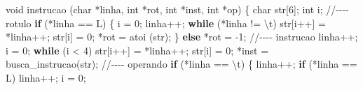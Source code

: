 \documentclass[
  brazilian,
  letterpaper,
]{book}
\newenvironment{Shaded}{\begin{snugshade}}{\end{snugshade}}
\newcommand{\CharTok}[1]{\textcolor[rgb]{0.13,0.47,0.30}{#1}}
\newcommand{\CommentTok}[1]{\textcolor[rgb]{0.37,0.37,0.37}{#1}}
\newcommand{\ControlFlowTok}[1]{\textcolor[rgb]{0.00,0.23,0.31}{\textbf{#1}}}
\newcommand{\DataTypeTok}[1]{\textcolor[rgb]{0.68,0.00,0.00}{#1}}
\newcommand{\DecValTok}[1]{\textcolor[rgb]{0.68,0.00,0.00}{#1}}
\newcommand{\NormalTok}[1]{\textcolor[rgb]{0.00,0.23,0.31}{#1}}
\newcommand{\OperatorTok}[1]{\textcolor[rgb]{0.37,0.37,0.37}{#1}}
\newcommand{\SpecialCharTok}[1]{\textcolor[rgb]{0.37,0.37,0.37}{#1}}
\theoremstyle{plain}
\theoremstyle{definition}
\theoremstyle{remark}
\begin{document}
\begin{Shaded}
\begin{Highlighting}[]
\DataTypeTok{void}\NormalTok{ instrucao }\OperatorTok{(}\DataTypeTok{char} \OperatorTok{*}\NormalTok{linha}\OperatorTok{,} \DataTypeTok{int} \OperatorTok{*}\NormalTok{rot}\OperatorTok{,} \DataTypeTok{int} \OperatorTok{*}\NormalTok{inst}\OperatorTok{,} \DataTypeTok{int} \OperatorTok{*}\NormalTok{op}\OperatorTok{)} \OperatorTok{\{}
    \DataTypeTok{char}\NormalTok{ str}\OperatorTok{[}\DecValTok{6}\OperatorTok{];}
    \DataTypeTok{int}\NormalTok{ i}\OperatorTok{;}
    \CommentTok{//{-}{-}{-}{-} rotulo}
    \ControlFlowTok{if} \OperatorTok{(*}\NormalTok{linha }\OperatorTok{==} \CharTok{\textquotesingle{}L\textquotesingle{}}\OperatorTok{)} \OperatorTok{\{}
\NormalTok{        i }\OperatorTok{=} \DecValTok{0}\OperatorTok{;}
\NormalTok{        linha}\OperatorTok{++;}
        \ControlFlowTok{while} \OperatorTok{(*}\NormalTok{linha }\OperatorTok{!=} \CharTok{\textquotesingle{}}\SpecialCharTok{\textbackslash{}t}\CharTok{\textquotesingle{}}\OperatorTok{)}
\NormalTok{           str}\OperatorTok{[}\NormalTok{i}\OperatorTok{++]} \OperatorTok{=} \OperatorTok{*}\NormalTok{linha}\OperatorTok{++;}
\NormalTok{        str}\OperatorTok{[}\NormalTok{i}\OperatorTok{]} \OperatorTok{=} \DecValTok{0}\OperatorTok{;}
        \OperatorTok{*}\NormalTok{rot }\OperatorTok{=}\NormalTok{ atoi }\OperatorTok{(}\NormalTok{str}\OperatorTok{);}
    \OperatorTok{\}} \ControlFlowTok{else} \OperatorTok{*}\NormalTok{rot }\OperatorTok{=} \OperatorTok{{-}}\DecValTok{1}\OperatorTok{;}
    \CommentTok{//{-}{-}{-}{-} instrucao}
\NormalTok{    linha}\OperatorTok{++;}
\NormalTok{    i }\OperatorTok{=} \DecValTok{0}\OperatorTok{;}
    \ControlFlowTok{while} \OperatorTok{(}\NormalTok{i }\OperatorTok{\textless{}} \DecValTok{4}\OperatorTok{)}
\NormalTok{        str}\OperatorTok{[}\NormalTok{i}\OperatorTok{++]} \OperatorTok{=} \OperatorTok{*}\NormalTok{linha}\OperatorTok{++;}
\NormalTok{    str}\OperatorTok{[}\NormalTok{i}\OperatorTok{]} \OperatorTok{=} \DecValTok{0}\OperatorTok{;}
    \OperatorTok{*}\NormalTok{inst }\OperatorTok{=}\NormalTok{ busca\_instrucao}\OperatorTok{(}\NormalTok{str}\OperatorTok{);}
    \CommentTok{//{-}{-}{-}{-} operando}
    \ControlFlowTok{if} \OperatorTok{(*}\NormalTok{linha }\OperatorTok{==} \CharTok{\textquotesingle{}}\SpecialCharTok{\textbackslash{}t}\CharTok{\textquotesingle{}}\OperatorTok{)} \OperatorTok{\{}
\NormalTok{        linha}\OperatorTok{++;}
        \ControlFlowTok{if} \OperatorTok{(*}\NormalTok{linha }\OperatorTok{==} \CharTok{\textquotesingle{}L\textquotesingle{}}\OperatorTok{)}
\NormalTok{           linha}\OperatorTok{++;}
\NormalTok{        i }\OperatorTok{=} \DecValTok{0}\OperatorTok{;}

\end{Highlighting}
\end{Shaded}
\end{document}
